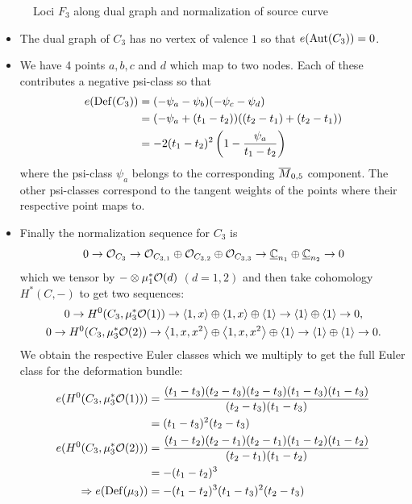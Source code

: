 \documentclass[12pt]{memoir}
\begin{document}
\begin{Ex}
\begin{figure}[h!]
        \caption{Loci $F_3$ along dual graph and normalization of source curve}
        \label{fig:quadratic-F3-5-marks}
    \end{figure}
    \begin{itemize}
        \item The dual graph of $C_3$ has no vertex of valence $1$ so that $e(\operatorname{Aut}(C_3))=0$.
        \item We have 4 points $a,b,c$ and $d$ which map to two nodes. Each of these contributes a negative psi-class so that 
        \begin{align*}
            e(\operatorname{Def}(C_3))&=(-\psi_a-\psi_b)(-\psi_c-\psi_d)\\
            &=(-\psi_a+(t_1-t_2))((t_2-t_1)+(t_2-t_1))\\
            &=-2(t_1-t_2)^2\left(1-\frac{\psi_a}{t_1-t_2}\right)
        \end{align*}
        where the psi-class $\psi_a$ belongs to the corresponding $\overline{M}_{0,5}$ component. The other psi-classes correspond to the tangent weights of the points where their respective point maps to.
        \item Finally the normalization sequence for $C_3$ is 
        $$0\to\mathcal{O}_{C_3}\to\mathcal{O}_{C_{3,1}}\oplus\mathcal{O}_{C_{3,2}}\oplus\mathcal{O}_{C_{3,3}}\to\underline{\mathbb{C}}_{n_1}\oplus\underline{\mathbb{C}}_{n_2}\to 0$$
        which we tensor by $-\otimes \mu_1^\ast\mathcal{O}(d)$ $(d=1,2)$ and then take cohomology $H^\ast(C,-)$ to get two sequences:
        \begin{gather*}
            0\to H^0(C_3,\mu_3^\ast\mathcal{O}(1))\to\left\langle 1,x\right\rangle\oplus\left\langle 1,x\right\rangle\oplus\left\langle 1\right\rangle\to\left\langle 1\right\rangle\oplus\left\langle 1\right\rangle\to 0,\\
            0\to H^0(C_3,\mu_3^\ast\mathcal{O}(2))\to\left\langle 1,x,x^2\right\rangle\oplus\left\langle 1,x,x^2\right\rangle\oplus\left\langle 1\right\rangle\to\left\langle 1\right\rangle\oplus\left\langle 1\right\rangle\to 0.
        \end{gather*}
        We obtain the respective Euler classes which we multiply to get the full Euler class for the deformation bundle:
        \begin{align*}
        e(H^0(C_3,\mu_3^\ast\mathcal{O}(1)))&=\frac{(t_1-t_3)(t_2-t_3)(t_2-t_3)(t_1-t_3)(t_1-t_3)}{(t_2-t_3)(t_1-t_3)}\\
        &=(t_1-t_3)^2(t_2-t_3)\\
        e(H^0(C_3,\mu_3^\ast\mathcal{O}(2)))&=\frac{(t_1-t_2)(t_2-t_1)(t_2-t_1)(t_1-t_2)(t_1-t_2)}{(t_2-t_1)(t_1-t_2)}\\
        &=-(t_1-t_2)^3\\
        \Rightarrow e(\operatorname{Def}(\mu_3))&=-(t_1-t_2)^3(t_1-t_3)^2(t_2-t_3)
        \end{align*}

\end{itemize}
\end{Ex}
\end{document}
